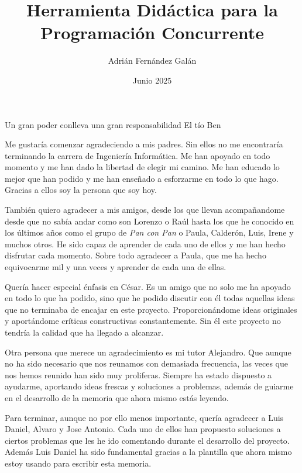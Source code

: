 \documentclass[es]{uc3mthesisIEEE}
\title{Herramienta Didáctica para la Programación Concurrente}
\author{Adrián Fernández Galán}
\date{Junio 2025}
\begin{document}
  \makecover


  \makeepigraph
    {Un gran poder conlleva una gran responsabilidad}  %
    {El tío Ben}  %
    {}  %


  \begin{acknowledgements}
    Me gustaría comenzar agradeciendo a mis padres. Sin ellos no me encontraría terminando la carrera de Ingeniería Informática. Me han apoyado en todo momento y me han dado la libertad de elegir mi camino. Me han educado lo mejor que han podido y me han enseñado a esforzarme en todo lo que hago. Gracias a ellos soy la persona que soy hoy. 

    También quiero agradecer a mis amigos, desde los que llevan acompañandome desde que no sabía andar como son Lorenzo o Raúl hasta los que he conocido en los últimos años como el grupo de \textit{Pan con Pan} o Paula, Calderón, Luis, Irene y muchos otros. He sido capaz de aprender de cada uno de ellos y me han hecho disfrutar cada momento. Sobre todo agradecer a Paula, que me ha hecho equivocarme mil y una veces y aprender de cada una de ellas.   
    
    Quería hacer especial énfasis en César. Es un amigo que no solo me ha apoyado en todo lo que ha podido, sino que he podido discutir con él todas aquellas ideas que no terminaba de encajar en este proyecto. Proporcionándome ideas originales y aportándome críticas constructivas constantemente. Sin él este proyecto no tendría la calidad que ha llegado a alcanzar.
    
    Otra persona que merece un agradecimiento es mi tutor Alejandro. Que aunque no ha sido necesario que nos reunamos con demasiada frecuencia, las veces que nos hemos reunido han sido muy proliferas. Siempre ha estado dispuesto a ayudarme, aportando ideas frescas y soluciones a problemas, además de guiarme en el desarrollo de la memoria que ahora mismo estás leyendo.

    Para terminar, aunque no por ello menos importante, quería agradecer a Luis Daniel, Alvaro y Jose Antonio. Cada uno de ellos han propuesto soluciones a ciertos problemas que les he ido comentando durante el desarrollo del proyecto. Además Luis Daniel ha sido fundamental gracias a la plantilla que ahora mismo estoy usando para escribir esta memoria.
    
  \end{acknowledgements}
\end{document}
